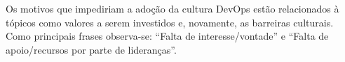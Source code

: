 \documentclass[twoside,english,brazilian]{UNISINOSartigo}
\begin{document}
Os motivos que impediriam a adoção da cultura DevOps estão relacionados à tópicos como valores a serem investidos e, novamente, as barreiras culturais. Como principais frases observa-se: ``Falta de interesse/vontade'' e ``Falta de apoio/recursos por parte de lideranças''.












\end{document}
